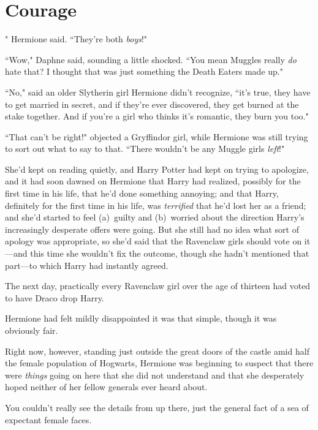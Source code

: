 \chapter{Courage}

" Hermione said. ``They're both \emph{boys}!"

\hplettrineextrapara
``Wow," Daphne said, sounding a little shocked. ``You mean Muggles really \emph{do} hate that? I thought that was just something the Death Eaters made up."

``No," said an older Slytherin girl Hermione didn't recognize, ``it's true, they have to get married in secret, and if they're ever discovered, they get burned at the stake together. And if you're a girl who thinks it's romantic, they burn you too."

``That can't be right!" objected a Gryffindor girl, while Hermione was still trying to sort out what to say to that. ``There wouldn't be any Muggle girls \emph{left}!"

She'd kept on reading quietly, and Harry Potter had kept on trying to apologize, and it had soon dawned on Hermione that Harry had realized, possibly for the first time in his life, that he'd done something annoying; and that Harry, definitely for the first time in his life, was \emph{terrified} that he'd lost her as a friend; and she'd started to feel (a)~guilty and (b)~worried about the direction Harry's increasingly desperate offers were going. But she still had no idea what sort of apology was appropriate, so she'd said that the Ravenclaw girls should vote on it—and this time she wouldn't fix the outcome, though she hadn't mentioned that part—to which Harry had instantly agreed.

The next day, practically every Ravenclaw girl over the age of thirteen had voted to have Draco drop Harry.

Hermione had felt mildly disappointed it was that simple, though it was obviously fair.

Right now, however, standing just outside the great doors of the castle amid half the female population of Hogwarts, Hermione was beginning to suspect that there were \emph{things} going on here that she did not understand and that she desperately hoped neither of her fellow generals ever heard about.

\later

You couldn't really see the details from up there, just the general fact of a sea of expectant female faces.

